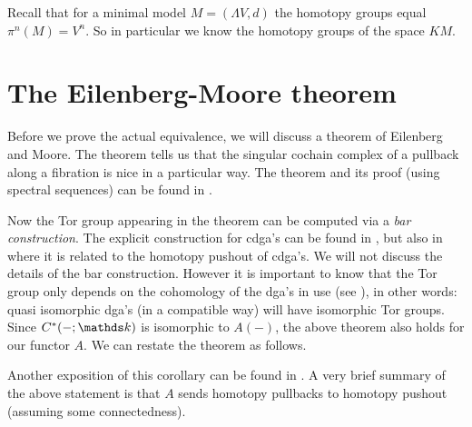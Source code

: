 Recall that for a minimal model $M = (\Lambda V, d)$ the homotopy groups equal $\pi^n(M) = V^n$. So in particular we know the homotopy groups of the space $KM$.



\section{The Eilenberg-Moore theorem}
Before we prove the actual equivalence, we will discuss a theorem of Eilenberg and Moore. The theorem tells us that the singular cochain complex of a pullback along a fibration is nice in a particular way. The theorem and its proof (using spectral sequences) can be found in \cite[Theorem 7.14]{mccleary}.


Now the Tor group appearing in the theorem can be computed via a \emph{bar construction}. The explicit construction for cdga's can be found in \cite{bousfield}, but also in \cite{olsson} where it is related to the homotopy pushout of cdga's. We will not discuss the details of the bar construction. However it is important to know that the Tor group only depends on the cohomology of the dga's in use (see \cite[Corollary 7.7]{mccleary}), in other words: quasi isomorphic dga's (in a compatible way) will have isomorphic Tor groups. Since $C^\ast(-;\k)$ is isomorphic to $A(-)$, the above theorem also holds for our functor $A$. We can restate the theorem as follows.

Another exposition of this corollary can be found in \cite[Section 8.4]{berglund}. A very brief summary of the above statement is that $A$ sends homotopy pullbacks to homotopy pushout (assuming some connectedness).


